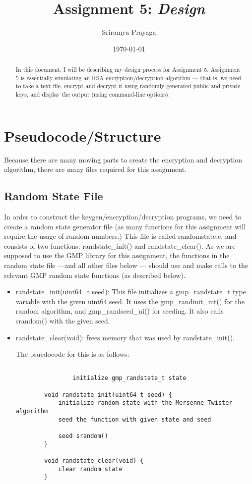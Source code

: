 \documentclass[11pt]{article}
\title{Assignment 5: \emph{Design}}
\author{Sriramya Prayaga}
\date{\today}
\begin{document}
 \maketitle

\begin{abstract}
\begin{center}
	In this document, I will be describing my design process for Assignment 5. Assignment 5 is essentially simulating an RSA encryption/decryption algorithm --- that is, we need to take a text file, encrypt and decrypt it using randomly-generated public and private keys, and display the output (using command-line options).
\end{center}
\end{abstract}
\section{Pseudocode/Structure}
Because there are many moving parts to create the encryption and decryption algorithm, there are many files required for this assignment.
\subsection{Random State File}
In order to construct the keygen/encryption/decryption programs, we need to create a random state generator file (as many functions for this assignment will require the usage of random numbers.) This file is called randomstate.c, and consists of two functions: randstate\_init() and randstate\_clear(). As we are supposed to use the GMP library for this assignment, the functions in the random state file ---and all other files below --- should use and make calls to the relevant GMP random state functions (as described below). \begin{itemize}

	\item randstate\_init(uint64\_t seed):  This file initializes a gmp\_randstate\_t type variable with the given uint64 seed. It uses the gmp\_randinit\_mt() for the random algorithm, and gmp\_randseed\_ui() for seeding. It also calls srandom() with the given seed.

	\item randstate\_clear(void): frees memory that was used by randstate\_init().

	The psuedocode for this is as follows: 

\begin{verbatim}

                initialize gmp_randstate_t state

		void randstate_init(uint64_t seed) {
			initialize random state with the Mersenne Twister algorithm
			seed the function with given state and seed
                        
			seed srandom()
		}

		void randstate_clear(void) {
			clear random state
		}

\end{verbatim}

\end{itemize}
\end{document}
